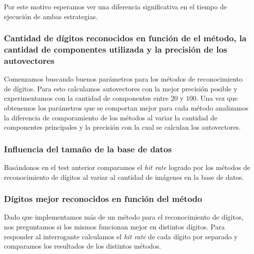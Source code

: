 		Por este motivo esperamos ver una diferencia significativa en el tiempo de
		ejecuci\'on de ambas estrategias.

	\subsubsection{Cantidad de d\'igitos reconocidos en funci\'on de el m\'etodo,
	la cantidad de componentes utilizada y la precisi\'on de los autovectores}
		Comenzamos buscando buenos par\'ametros para los m\'etodos de reconocimiento
		de d\'igitos. Para esto calculamos autovectores con la mejor precisi\'on
		posible y experimentamos con la cantidad de componentes entre $20$ y $100$.
		Una vez que obtenemos los par\'ametros que se comportan mejor para cada
		m\'etodo analizamos la diferencia de comporamiento de los m\'etodos
		al variar la cantidad de componentes principales y la precisi\'on con
		la cual se calculan los autovectores.

	\subsubsection{Influencia del tama\~no de la base de datos}
		Bas\'andonos en el test anterior comparamos el \textit{hit rate} logrado
		por los m\'etodos de reconocimiento de d\'igitos al variar al cantidad
		de im\'agenes en la base de datos.
		
	\subsubsection{D\'igitos mejor reconocidos en funci\'on del m\'etodo}
		Dado que implementamos m\'as de un m\'etodo para el reconocimiento de
		d\'igitos, nos preguntamos si los mismos funcionan mejor en distintos
		d\'igitos. Para responder al interrogante calculamos el \textit{hit rate}
		de cada d\'igito por separado y comparamos los resultados de los
		distintos m\'etodos.
